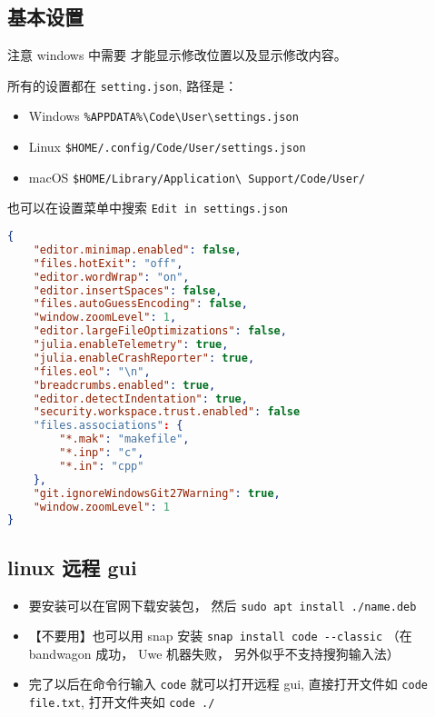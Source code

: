 
\subsection{基本设置}

注意 windows 中需要  才能显示修改位置以及显示修改内容。

所有的设置都在 \verb`setting.json`, 路径是：
\begin{itemize}
\item Windows \verb`%APPDATA%\Code\User\settings.json`
\item Linux \verb`$HOME/.config/Code/User/settings.json`
\item macOS \verb`$HOME/Library/Application\ Support/Code/User/`
\end{itemize}

也可以在设置菜单中搜索 \verb`Edit in settings.json`

\begin{lstlisting}[language=json,caption=settings.json]
{
	"editor.minimap.enabled": false,
	"files.hotExit": "off",
	"editor.wordWrap": "on",
    "editor.insertSpaces": false,
	"files.autoGuessEncoding": false,
	"window.zoomLevel": 1,
	"editor.largeFileOptimizations": false,
	"julia.enableTelemetry": true,
	"julia.enableCrashReporter": true,
	"files.eol": "\n",
	"breadcrumbs.enabled": true,
	"editor.detectIndentation": true,
	"security.workspace.trust.enabled": false
	"files.associations": {
		"*.mak": "makefile",
		"*.inp": "c",
		"*.in": "cpp"
	},
	"git.ignoreWindowsGit27Warning": true,
	"window.zoomLevel": 1
}
\end{lstlisting}


\subsection{linux 远程 gui}
\begin{itemize}
\item 要安装可以在官网下载安装包， 然后 \verb`sudo apt install ./name.deb`
\item 【不要用】也可以用 snap 安装 \verb`snap install code --classic` （在 bandwagon 成功， Uwe 机器失败， 另外似乎不支持搜狗输入法）
\item 完了以后在命令行输入 \verb`code` 就可以打开远程 gui, 直接打开文件如 \verb`code file.txt`, 打开文件夹如 \verb`code ./`
\end{itemize}
